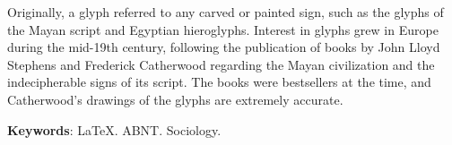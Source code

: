 \documentclass[12pt,article,oneside,a4paper,english,brazil]{abntex2}
\begin{document}
\postextual

\begin{resumo}[English]
Originally, a glyph referred to any carved or painted sign, such as the glyphs of the Mayan script and Egyptian hieroglyphs. Interest in glyphs grew in Europe during the mid-19th century, following the publication of books by John Lloyd Stephens and Frederick Catherwood regarding the Mayan civilization and the indecipherable signs of its script. The books were bestsellers at the time, and Catherwood's drawings of the glyphs are extremely accurate.
 
 \noindent
 \textbf{Keywords}: LaTeX. ABNT. Sociology.
\end{resumo}


\end{document}
